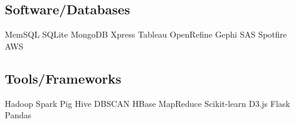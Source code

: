 \documentclass[]{deedy-resume-openfont}
\begin{document}
\begin{minipage}[t]{0.31\textwidth}
\subsection{Software/Databases}
\textbullet{} MemSQL \textbullet{} SQLite \textbullet{} MongoDB  \textbullet{} Xpress \textbullet{} Tableau \textbullet{} OpenRefine \textbullet{} Gephi \textbullet{} SAS \textbullet{} Spotfire \textbullet{} AWS 
\sectionsep

\subsection{Tools/Frameworks}
\textbullet{} Hadoop \textbullet{} Spark \textbullet{} Pig \textbullet{} Hive \textbullet{} DBSCAN \textbullet{} HBase \textbullet{} MapReduce \textbullet{} Scikit-learn \textbullet{} D3.js \textbullet{} Flask \textbullet{} Pandas 
\sectionsep

%
%

\end{minipage} 
\hfill
\end{document}
